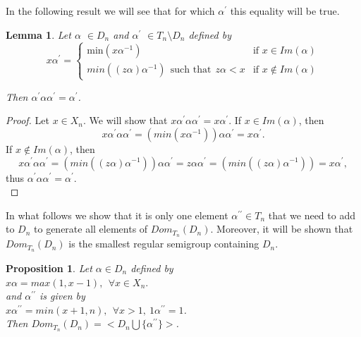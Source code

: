 \documentclass[10pt]{extarticle}
\numberwithin{equation}{section}
\numberwithin{bbb}{section}
\newtheorem{proposition}{Proposition}[section]
\newtheorem{lemma}{Lemma}[section]
\numberwithin{equation}{section}
\begin{document}
\vspace{0.8cm}
In the following result we will see that for which $\alpha^{\prime}$ this equality will be true.

\vspace{0.1cm}
\begin{lemma}
Let $\alpha$ $\in D_n$ and $\alpha^{\prime}$ $\in T_n \setminus D_n$ defined by
 \begin{equation}
 \tag{2}
    x\alpha^{\prime}=
    \begin{cases}
    \text{min} (x\alpha^{-1}) & \text{if } x \in Im(\alpha)\\
    min((z\alpha)\alpha^{-1}) \ \ \text{such that} \ \ z\alpha <x  & \text{if } x \notin Im(\alpha)
    \end{cases}
\end{equation}

Then $\alpha^{\prime}\alpha\alpha^{\prime}=\alpha^{\prime}$.
 \end{lemma}

\begin{proof}
    Let $x \in X_n$. We will show that $x\alpha^{\prime}\alpha\alpha^{\prime}=x\alpha^{\prime}$. If $x \in Im(\alpha)$, then $$x\alpha^{\prime}\alpha\alpha^{\prime} =(min(x\alpha^{-1}))\alpha\alpha^{\prime}=x\alpha^{\prime}.$$
    If $x \notin Im(\alpha)$, then   $$x\alpha^{\prime}\alpha\alpha^{\prime}=(min((z\alpha)\alpha^{-1}))\alpha\alpha^{\prime}= z\alpha\alpha^{\prime}=(min((z\alpha)\alpha^{-1}))=x\alpha^{\prime},$$
    thus $\alpha^{\prime}\alpha\alpha^{\prime}=\alpha^{\prime}$.\\
\end{proof}

In what follows we show that it is only one element $\alpha^{\prime\prime} \in T_n$ that we need to add to $D_n$ to generate all elements of $Dom_{T_{n}}(D_n)$. Moreover, it will be shown that $Dom_{T_{n}}(D_n)$ is the smallest regular semigroup containing $D_n$.

\vspace{0.1cm}
\begin{proposition} \label{ndn}
Let $\alpha \in D_n$ defined by \\ 
\vspace{0.1cm}
\hspace{6cm} $x\alpha=max(1,x-1), \ \ \forall x\in X_n.$\\
and $\alpha^{\prime\prime}$ is given by\\
\vspace{0.1cm}
\hspace{6cm} $x\alpha^{\prime\prime}=min(x+1,n), \ \ \forall x>1, \ 1\alpha^{\prime\prime}=1$.\\ 
Then $Dom_{T_n}(D_n)=<D_n \bigcup \{{\alpha^{\prime\prime}}\}>$.
\end{proposition}
\end{document}
